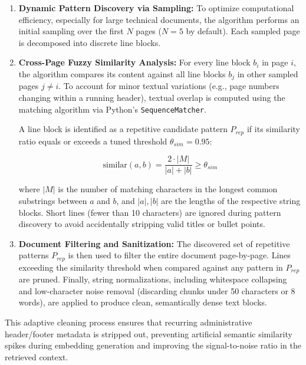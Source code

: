 \begin{enumerate}
    \item \textbf{Dynamic Pattern Discovery via Sampling:} To optimize computational efficiency, especially for large technical documents, the algorithm performs an initial sampling over the first $N$ pages ($N = 5$ by default). Each sampled page is decomposed into discrete line blocks.
    
    \item \textbf{Cross-Page Fuzzy Similarity Analysis:} For every line block $b_i$ in page $i$, the algorithm compares its content against all line blocks $b_j$ in other sampled pages $j \neq i$. To account for minor textual variations (e.g., page numbers changing within a running header), textual overlap is computed using the matching algorithm via Python's \texttt{SequenceMatcher}. 
    
    A line block is identified as a repetitive candidate pattern $P_{rep}$ if its similarity ratio equals or exceeds a tuned threshold $\theta_{sim} = 0.95$:
    
    \begin{equation}
    \text{similar}(a, b) = \frac{2 \cdot |M|}{|a| + |b|} \ge \theta_{sim}
    \end{equation}
    
    where $|M|$ is the number of matching characters in the longest common substrings between $a$ and $b$, and $|a|, |b|$ are the lengths of the respective string blocks. Short lines (fewer than 10 characters) are ignored during pattern discovery to avoid accidentally stripping valid titles or bullet points.

    \item \textbf{Document Filtering and Sanitization:} The discovered set of repetitive patterns $P_{rep}$ is then used to filter the entire document page-by-page. Lines exceeding the similarity threshold when compared against any pattern in $P_{rep}$ are pruned. Finally, string normalizations, including whitespace collapsing and low-character noise removal (discarding chunks under 50 characters or 8 words), are applied to produce clean, semantically dense text blocks.
\end{enumerate}

This adaptive cleaning process ensures that recurring administrative header/footer metadata is stripped out, preventing artificial semantic similarity spikes during embedding generation and improving the signal-to-noise ratio in the retrieved context.

